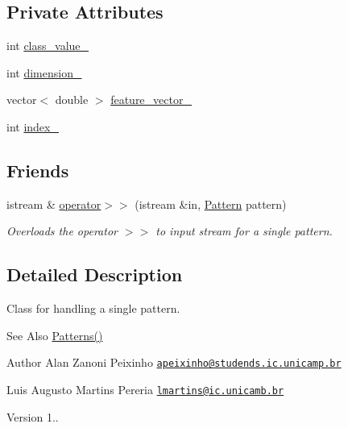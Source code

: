 \subsection*{Private Attributes}
\begin{DoxyCompactItemize}
\item 
int \hyperlink{classPattern_a739dc0a44f9aca7a860ccba0c303bdd3}{class\+\_\+value\+\_\+}
\item 
int \hyperlink{classPattern_aca4d3f613b783e6190691ae71531374d}{dimension\+\_\+}
\item 
vector$<$ double $>$ \hyperlink{classPattern_a8920639f6ec13502728eaf390056ee13}{feature\+\_\+vector\+\_\+}
\item 
int \hyperlink{classPattern_a029289d4eac5c7d338f34c428ffc6a55}{index\+\_\+}
\end{DoxyCompactItemize}
\subsection*{Friends}
\begin{DoxyCompactItemize}
\item 
istream \& \hyperlink{classPattern_a27ae4d6c06ab6d17ff9392ba3f5a5532}{operator$>$$>$} (istream \&in, \hyperlink{classPattern}{Pattern} pattern)
\begin{DoxyCompactList}\small\item\em Overloads the operator $>$$>$ to input stream for a single pattern. \end{DoxyCompactList}\end{DoxyCompactItemize}


\subsection{Detailed Description}
Class for handling a single pattern. 

\begin{DoxySeeAlso}{See Also}
\hyperlink{classPatterns}{Patterns()}
\end{DoxySeeAlso}
\begin{DoxyAuthor}{Author}
Alan Zanoni Peixinho \href{mailto:apeixinho@studends.ic.unicamp.br}{\tt apeixinho@studends.\+ic.\+unicamp.\+br} 

Luis Augusto Martins Pereria \href{mailto:lmartins@ic.unicamb.br}{\tt lmartins@ic.\+unicamb.\+br} 
\end{DoxyAuthor}
\begin{DoxyVersion}{Version}
1.. 
\end{DoxyVersion}


